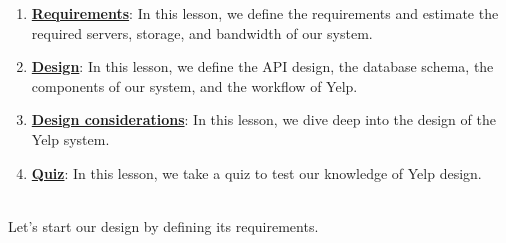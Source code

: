 \begin{enumerate}
\item
\protect{}\label{ar9ZfVuuTuerOlWhSf6Pf}
\href{https://www.educative.io/courses/grokking-the-system-design-interview/requirements-of-yelps-design}{\textbf{Requirements}}: In this lesson, we define the requirements and estimate the required servers, storage, and bandwidth of our system.
\item
\protect{}\label{VF8xYF-6mTMvOguzhFjVs}
\href{https://www.educative.io/courses/grokking-the-system-design-interview/design-of-yelp}{\textbf{Design}}: In this lesson, we define the API design, the database schema, the components of our system, and the workflow of Yelp.
\item
\protect{}\label{mM_-kdUQZ_fox_2fT0ONr}
\href{https://www.educative.io/courses/grokking-the-system-design-interview/design-considerations-of-yelp}{\textbf{Design considerations}}: In this lesson, we dive deep into the design of the Yelp system.
\item
\protect{}\label{IFSJRf4ROmQ-cJ8gC4KXs}
\href{https://www.educative.io/courses/grokking-the-system-design-interview/quiz-on-yelps-design}{\textbf{Quiz}}: In this lesson, we take a quiz to test our knowledge of Yelp design.
\end{enumerate}
\\
Let's start our design by defining its requirements.

